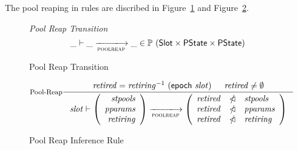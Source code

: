 The pool reaping in rules are discribed in
Figure~\ref{fig:ts-types:pool-reap} and Figure~\ref{fig:rules:pool-reap}.



\begin{figure}
  \emph{Pool Reap Transition}
  \begin{equation*}
    \_ \vdash \_ \trans{poolreap}{} \_ \in
    \powerset (\Slot \times \PState \times \PState)
  \end{equation*}
  \caption{Pool Reap Transition}
  \label{fig:ts-types:pool-reap}
\end{figure}


\begin{figure}

  \begin{equation}\label{eq:pool-reap}
    \inference[Pool-Reap]
    {
      \var{retired} = \var{retiring}^{-1}~\var{(\epoch{slot})}
      & \var{retired} \neq \emptyset
    }
    {
      \var{slot} \vdash
      \left(
      \begin{array}{r}
        \var{stpools} \\
        \var{pparams} \\
        \var{retiring}
      \end{array}
      \right)
      \trans{poolreap}{}
      \left(
      \begin{array}{rcl}
        \var{retired} & \subtractdom & \var{stpools} \\
        \var{retired} & \subtractdom & \var{pparams} \\
        \var{retired} & \subtractdom & \var{retiring} \\
      \end{array}
      \right)
    }
  \end{equation}
  \caption{Pool Reap Inference Rule}
  \label{fig:rules:pool-reap}

\end{figure}
